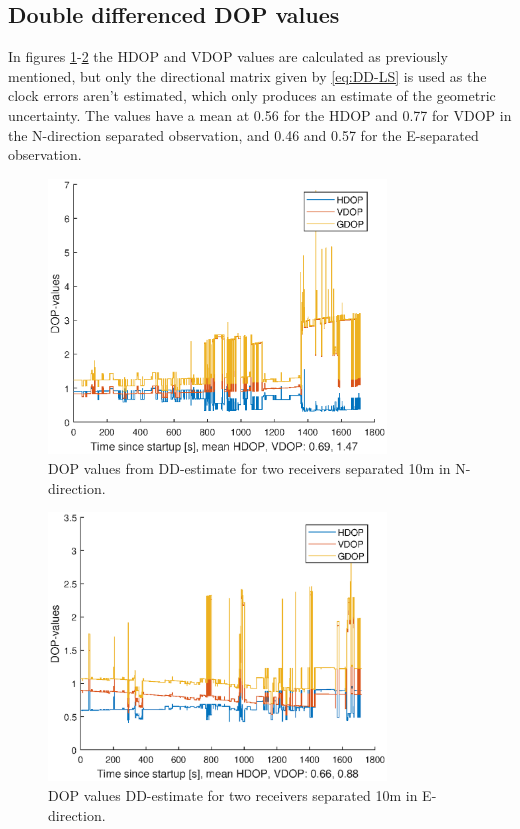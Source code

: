 \subsection{Double differenced DOP values}
In figures \ref{fig:DD_DOP1}-\ref{fig:DD_DOP2} the HDOP and VDOP values are calculated as previously mentioned, but only the directional matrix given by \ref{eq:DD-LS} is used as the clock errors aren't estimated, which only produces an estimate of the geometric uncertainty. The values have a mean at 0.56 for the HDOP and 0.77 for VDOP in the N-direction separated observation, and 0.46 and 0.57 for the E-separated observation. 
\begin{figure}[!htb]
\includegraphics[width=0.8\textwidth]{Results/DDDOPN}
\caption{\label{fig:DD_DOP1} DOP values from DD-estimate for two receivers separated 10m in N-direction.}
\end{figure}
\begin{figure}[!htb]
\includegraphics[width=0.8\textwidth]{Results/DDDOPE}
\caption{\label{fig:DD_DOP2} DOP values DD-estimate for two receivers separated 10m in E-direction.}
\end{figure}
